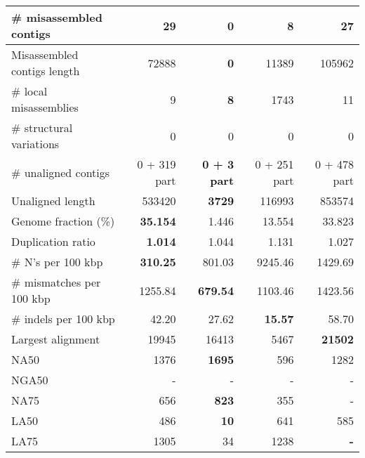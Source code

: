 \documentclass[12pt,a4paper]{article}
\begin{document}
\begin{table}[ht]
\begin{center}
\begin{tabular}{|l*{4}{|r}|}
\# misassembled contigs & 29 & {\bf 0} & 8 & 27 \\ \hline
Misassembled contigs length & 72888 & {\bf 0} & 11389 & 105962 \\ \hline
\# local misassemblies & 9 & {\bf 8} & 1743 & 11 \\ \hline
\# structural variations & 0 & 0 & 0 & 0 \\ \hline
\# unaligned contigs & 0 + 319 part & {\bf 0 + 3 part} & 0 + 251 part & 0 + 478 part \\ \hline
Unaligned length & 533420 & {\bf 3729} & 116993 & 853574 \\ \hline
Genome fraction (\%) & {\bf 35.154} & 1.446 & 13.554 & 33.823 \\ \hline
Duplication ratio & {\bf 1.014} & 1.044 & 1.131 & 1.027 \\ \hline
\# N's per 100 kbp & {\bf 310.25} & 801.03 & 9245.46 & 1429.69 \\ \hline
\# mismatches per 100 kbp & 1255.84 & {\bf 679.54} & 1103.46 & 1423.56 \\ \hline
\# indels per 100 kbp & 42.20 & 27.62 & {\bf 15.57} & 58.70 \\ \hline
Largest alignment & 19945 & 16413 & 5467 & {\bf 21502} \\ \hline
NA50 & 1376 & {\bf 1695} & 596 & 1282 \\ \hline
NGA50 & - & - & - & - \\ \hline
NA75 & 656 & {\bf 823} & 355 & - \\ \hline
LA50 & 486 & {\bf 10} & 641 & 585 \\ \hline
LA75 & 1305 & 34 & 1238 & {\bf -} \\ \hline
\end{tabular}
\end{center}
\end{table}
\end{document}
